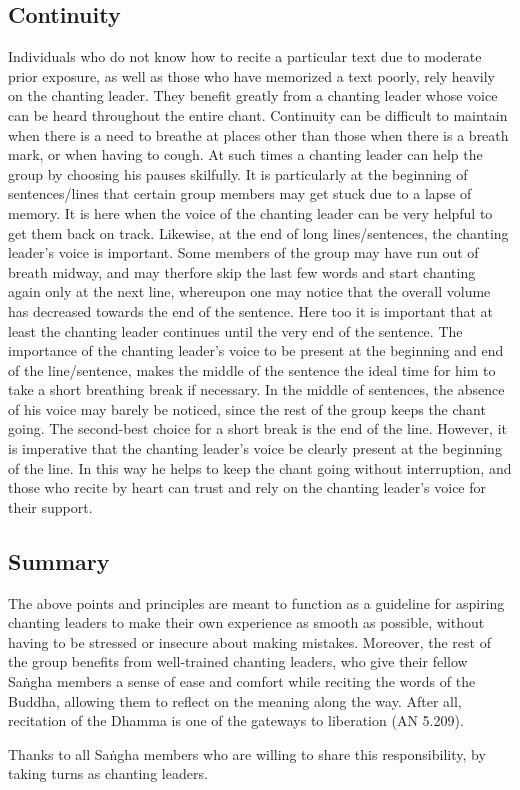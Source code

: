 \subsection*{Continuity}
\begin{justify}
  Individuals who do not know how to recite a particular text due to moderate prior exposure, as well as those who have memorized a text poorly, rely heavily on the chanting leader. They benefit greatly from a chanting leader whose voice can be heard throughout the entire chant. Continuity can be difficult to maintain when there is a need to breathe at places other than those when there is a breath mark, or when having to cough. At such times a chanting leader can help the group by choosing his pauses skilfully. It is particularly at the beginning of sentences/lines that certain group members may get stuck due to a lapse of memory. It is here when the voice of the chanting leader can be very helpful to get them back on track. Likewise, at the end of long lines/sentences, the chanting leader's voice is important. Some members of the group may have run out of breath midway, and may therfore skip the last few words and start chanting again only at the next line, whereupon one may notice that the overall volume has decreased towards the end of the sentence. Here too it is important that at least the chanting leader continues until the very end of the sentence. The importance of the chanting leader's voice to be present at the beginning and end of the line/sentence, makes the middle of the sentence the ideal time for him to take a short breathing break if necessary. In the middle of sentences, the absence of his voice may barely be noticed, since the rest of the group keeps the chant going. The second-best choice for a short break is the end of the line. However, it is imperative that the chanting leader's voice be clearly present at the beginning of the line. In this way he helps to keep the chant going without interruption, and those who recite by heart can trust and rely on the chanting leader's voice for their support.
\end{justify}

\subsection*{Summary}
\begin{justify}
  The above points and principles are meant to function as a guideline for aspiring chanting leaders to make their own experience as smooth as possible, without having to be stressed or insecure about making mistakes. Moreover, the rest of the group benefits from well-trained chanting leaders, who give their fellow Saṅgha members a sense of ease and comfort while reciting the words of the Buddha, allowing them to reflect on the meaning along the way. After all, recitation of the Dhamma is one of the gateways to liberation (AN 5.209).
\end{justify}

\begin{justify}
  Thanks to all Saṅgha members who are willing to share this responsibility, by taking turns as chanting leaders.
\end{justify}
